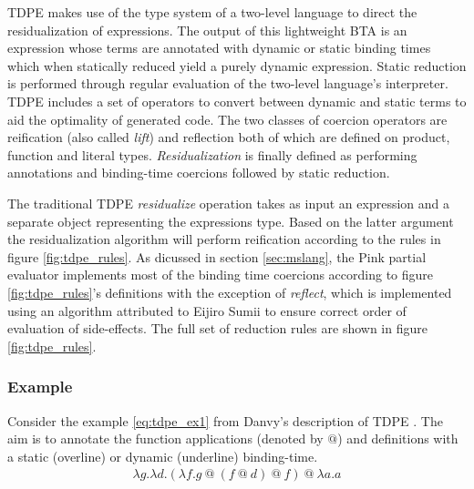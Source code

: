 \documentclass[a4paper,12pt,twoside,openright]{report}
\theoremstyle{definition}
\begin{document}
TDPE makes use of the type system of a two-level language to direct the residualization of expressions. The output of this lightweight BTA is an expression whose terms are annotated with dynamic or static binding times which when statically reduced yield a purely dynamic expression. Static reduction is performed through regular evaluation of the two-level language's interpreter. TDPE includes a set of operators to convert between dynamic and static terms to aid the optimality of generated code. The two classes of coercion operators are reification (also called \textit{lift}) and reflection both of which are defined on product, function and literal types. \textit{Residualization} is finally defined as performing annotations and binding-time coercions followed by static reduction.

The traditional TDPE \textit{residualize} operation takes as input an expression and a separate object representing the expressions type. Based on the latter argument the residualization algorithm will perform reification according to the rules in figure \ref{fig:tdpe_rules}. As dicussed in section \ref{sec:mslang}, the Pink \cite{amin2017collapsing} partial evaluator implements most of the binding time coercions according to figure \ref{fig:tdpe_rules}'s definitions with the exception of \textit{reflect}, which is implemented using an algorithm attributed to Eijiro Sumii \cite{hatcliff2007partial} to ensure correct order of evaluation of side-effects. The full set of reduction rules are shown in figure \ref{fig:tdpe_rules}.

\subsubsection{Example}
Consider the example \eqref{eq:tdpe_ex1} from Danvy's description of TDPE \cite{danvy1999type}. The aim is to annotate the function applications (denoted by $@$) and definitions with a static (overline) or dynamic (underline) binding-time.
\begin{align}
    \lambda g.\lambda d.(\lambda f.g \:@ \: (f \: @ \: d)\: @ \:f) \: @ \: \lambda a.a \label{eq:tdpe_ex1}
\end{align}
\end{document}
